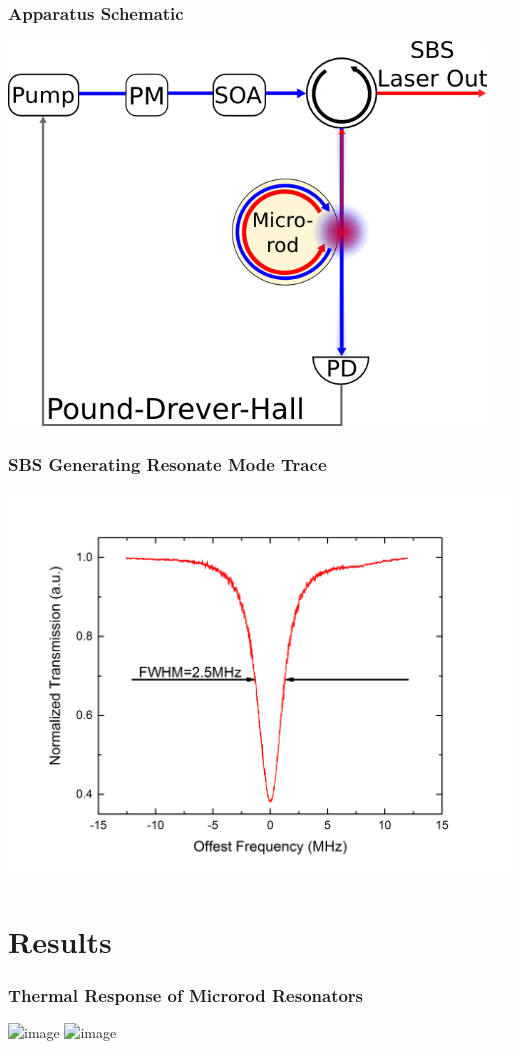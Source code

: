\documentclass{beamer}
\begin{document}
\begin{frame}\frametitle{Apparatus Schematic}
\includegraphics[width=0.95\textwidth]{Images/SBS_Microrod_Schematic.png}
\end{frame}

\begin{frame}\frametitle{SBS Generating Resonate Mode Trace}
\includegraphics[width=1.0\textwidth,keepaspectratio]{Images/SBS_Mode_Trace.png}
\end{frame}

\section{Results}
\begin{frame}\frametitle{Thermal Response of Microrod Resonators}
\includegraphics<1>[width=1.0\textwidth,keepaspectratio]{Images/Thermal_Response_Plot1.png}
\includegraphics<2>[width=1.0\textwidth,keepaspectratio]{Images/Thermal_Response_Plot2.png}
\end{frame}
\end{document}
